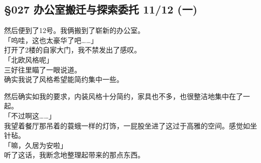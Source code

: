 \subsection{§027 办公室搬迁与探索委托 11/12 (一)}

然后便到了12号。我俩搬到了崭新的办公室。\\

「呜哇，这也太豪华了吧……」\\

打开了2楼的自家大门，我不禁发出了感叹。\\

「北欧风格呢」\\

三好往里瞄了一眼说道。\\

确实我说了风格希望能简约集中一些。

然后确实如我的要求，内装风格十分简约，家具也不多，也很整洁地集中在了一起。\\

「不过啊这……」\\

我望着餐厅那吊着的蓑蛾一样的灯饰，一屁股坐进了这过于高雅的空间。感觉如坐针毡。\\

「嘛，久居为安啦」\\

听了这话，我断念地整理起带来的那点东西。\\

